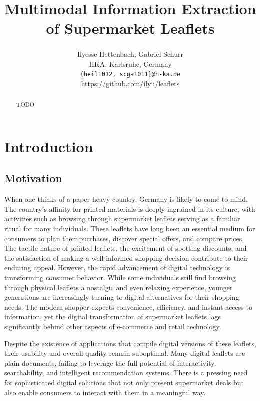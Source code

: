 \documentclass[11pt]{article}
\title{Multimodal Information Extraction of Supermarket Leaflets}
\author{Ilyesse Hettenbach\textsuperscript{}, Gabriel Schurr\textsuperscript{} \\
HKA, Karlsruhe, Germany \\
\texttt{\{heil1012, scga1011\}@h-ka.de} \\
\href{https://github.com/ilyii/leaflets}{https://github.com/ilyii/leaflets}
}
\begin{document}
\maketitle
\begin{abstract}
TODO
\end{abstract}

\section{Introduction}

\subsection{Motivation}
When one thinks of a paper-heavy country, Germany is likely to come to mind. The country's affinity for printed materials is deeply ingrained in its culture, with activities such as browsing through supermarket leaflets serving as a familiar ritual for many individuals. These leaflets have long been an essential medium for consumers to plan their purchases, discover special offers, and compare prices. The tactile nature of printed leaflets, the excitement of spotting discounts, and the satisfaction of making a well-informed shopping decision contribute to their enduring appeal.
However, the rapid advancement of digital technology is transforming consumer behavior. While some individuals still find browsing through physical leaflets a nostalgic and even relaxing experience, younger generations are increasingly turning to digital alternatives for their shopping needs. The modern shopper expects convenience, efficiency, and instant access to information, yet the digital transformation of supermarket leaflets lags significantly behind other aspects of e-commerce and retail technology.

Despite the existence of applications that compile digital versions of these leaflets, their usability and overall quality remain suboptimal. Many digital leaflets are plain documents, failing to leverage the full potential of interactivity, searchability, and intelligent recommendation systems. There is a pressing need for sophisticated digital solutions that not only present supermarket deals but also enable consumers to interact with them in a meaningful way. 
\end{document}
